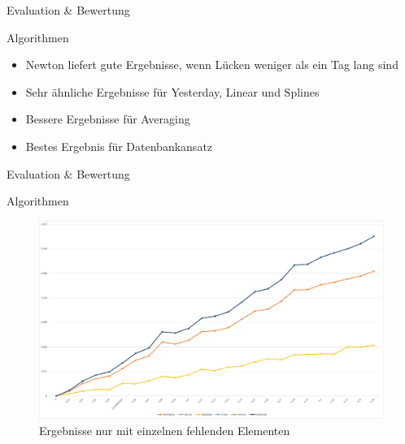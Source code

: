 \begin{frame}{Evaluation \& Bewertung}
\begin{block}{Algorithmen}
\begin{itemize}
	\item Newton liefert gute Ergebnisse, wenn Lücken weniger als ein Tag lang sind
	\item Sehr ähnliche Ergebnisse für Yesterday, Linear und Splines
	\item Bessere Ergebnisse für Averaging
	\item Bestes Ergebnis für Datenbankansatz
\end{itemize}
\end{block}
\end{frame}

\begin{frame}{Evaluation \& Bewertung}
\begin{block}{Algorithmen}
\begin{figure}
	\centering
	\includegraphics[width=1\textwidth]{pics/evaluation-algorithms-3.png}
	\caption{Ergebnisse nur mit einzelnen fehlenden Elementen}
\end{figure}
\end{block}
\end{frame}

